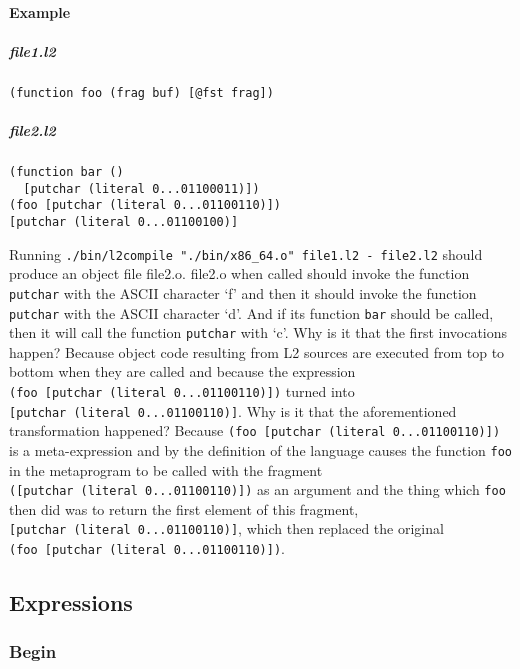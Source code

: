 \documentclass[]{article}
\let\oldparagraph\paragraph
\renewcommand{\paragraph}[1]{\oldparagraph{#1}\mbox{}}
\let\oldsubparagraph\subparagraph
\renewcommand{\subparagraph}[1]{\oldsubparagraph{#1}\mbox{}}
\begin{document}
\paragraph{Example}\label{example}

\subparagraph{file1.l2}\label{file1.l2}

\begin{verbatim}
(function foo (frag buf) [@fst frag])
\end{verbatim}

\subparagraph{file2.l2}\label{file2.l2}

\begin{verbatim}
(function bar ()
  [putchar (literal 0...01100011)])
(foo [putchar (literal 0...01100110)])
[putchar (literal 0...01100100)]
\end{verbatim}

Running
\texttt{./bin/l2compile\ "./bin/x86\_64.o"\ file1.l2\ -\ file2.l2}
should produce an object file file2.o. file2.o when called should invoke
the function \texttt{putchar} with the ASCII character `f' and then it
should invoke the function \texttt{putchar} with the ASCII character
`d'. And if its function \texttt{bar} should be called, then it will
call the function \texttt{putchar} with `c'. Why is it that the first
invocations happen? Because object code resulting from L2 sources are
executed from top to bottom when they are called and because the
expression \texttt{(foo\ {[}putchar\ (literal\ 0...01100110){]})} turned
into \texttt{{[}putchar\ (literal\ 0...01100110){]}}. Why is it that the
aforementioned transformation happened? Because
\texttt{(foo\ {[}putchar\ (literal\ 0...01100110){]})} is a
meta-expression and by the definition of the language causes the
function \texttt{foo} in the metaprogram to be called with the fragment
\texttt{({[}putchar\ (literal\ 0...01100110){]})} as an argument and the
thing which \texttt{foo} then did was to return the first element of
this fragment, \texttt{{[}putchar\ (literal\ 0...01100110){]}}, which
then replaced the original
\texttt{(foo\ {[}putchar\ (literal\ 0...01100110){]})}.

\hypertarget{expressions}{\subsection{Expressions}\label{expressions}}

\hypertarget{begin}{\subsubsection{Begin}\label{begin}}
\end{document}
